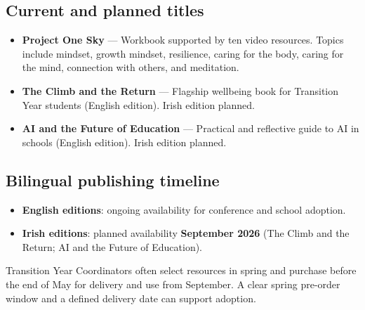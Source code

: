 \documentclass[11pt,a4paper]{article}
\renewcommand{\emoji}[1]{}
\begin{document}
\subsection{Current and planned titles}

\begin{tcolorbox}[
  colback=white,
  colframe=orange!70!black,
  opacityframe=0.5,
  fonttitle=\bfseries\color{black},
  title={\emoji{toolbox} Activity Box --- Books list (working blurbs)},
  drop shadow
]
\begin{itemize}
  \item \textbf{Project One Sky} --- Workbook supported by ten video resources. Topics include mindset, growth mindset, resilience, caring for the body, caring for the mind, connection with others, and meditation.
  \item \textbf{The Climb and the Return} --- Flagship wellbeing book for Transition Year students (English edition). Irish edition planned.
  \item \textbf{AI and the Future of Education} --- Practical and reflective guide to AI in schools (English edition). Irish edition planned.
\end{itemize}
\end{tcolorbox}

\subsection{Bilingual publishing timeline}

\begin{itemize}
  \item \textbf{English editions}: ongoing availability for conference and school adoption.
  \item \textbf{Irish editions}: planned availability \textbf{September 2026} (The Climb and the Return; AI and the Future of Education).
\end{itemize}

\begin{tcolorbox}[
  colback=white,
  colframe=green!40!black,
  opacityframe=0.5,
  fonttitle=\bfseries\color{black},
  title={\emoji{light_bulb} Tip Box --- Procurement reality for TY (Ireland)},
  drop shadow
]
Transition Year Coordinators often select resources in spring and purchase before the end of May for delivery and use from September. A clear spring pre-order window and a defined delivery date can support adoption.
\end{tcolorbox}
\end{document}
